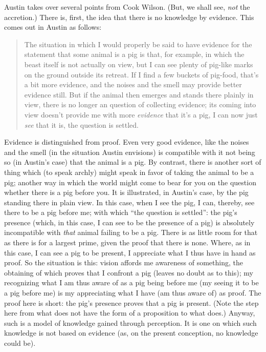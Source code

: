 Austin takes over several points from Cook Wilson. (But, we shall see, \emph{not} the accretion.) There is, first, the idea that there is no knowledge by evidence. This comes out in Austin as follows:
\begin{quote}
	The situation in which I would properly be said to have evidence for the statement that some animal is a pig is that, for example, in which the beast itself is not actually on view, but I can see plenty of pig-like marks on the ground outside its retreat. If I find a few buckets of pig-food, that’s a bit more evidence, and the noises and the smell may provide better evidence still. But if the animal then emerges and stands there plainly in view, there is no longer an question of collecting evidence; its coming into view doesn’t provide me with more \emph{evidence} that it’s a pig, I can now just \emph{see} that it is, the question is settled. \citep[115]{Austin:1962lr}
\end{quote}
Evidence is distinguished from proof. Even very good evidence, like the noises and the smell (in the situation Austin envisions) is compatible with it not being so (in Austin's case) that the animal is a pig. By contrast, there is another sort of thing which (to speak archly) might speak in favor of taking the animal to be a pig; another way in which the world might come to bear for you on the question whether there is a pig before you. It is illustrated, in Austin's case, by the pig standing there in plain view. In this case, when I see the pig, I can, thereby, see there to be a pig before me; with which ``the question is settled'': the pig's presence (which, in this case, I can see to be the presence of a pig) is absolutely incompatible with \emph{that} animal failing to be a pig. There is as little room for that as there is for a largest prime, given the proof that there is none. Where, as in this case, I can see a pig to be present, I appreciate what I thus have in hand as proof. So the situation is this: vision affords me awareness of something, the obtaining of which proves that I confront a pig (leaves no doubt as to this); my recognizing what I am thus aware of as a pig being before me (my seeing it to be a pig before me) is my appreciating what I have (am thus aware of) as proof. The proof here is short: the pig's presence proves that a pig is present. (Note the step here from what does not have the form of a proposition to what does.) Anyway, such is a model of knowledge gained through perception. It is one on which such knowledge is not based on evidence (as, on the present conception, no knowledge could be).

